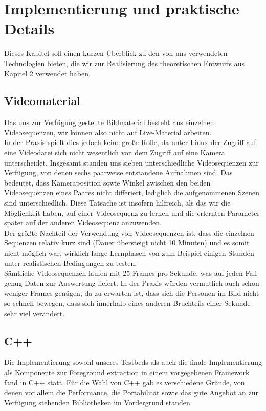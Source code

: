 \section{Implementierung und praktische Details}
\label{chap:implementierung}

Dieses Kapitel soll einen kurzen Überblick zu den von uns verwendeten Technologien bieten, die wir zur Realisierung des theoretischen Entwurfs aus Kapitel 2 verwendet haben.


\subsection{Videomaterial}
\label{sec:videomat}

Das uns zur Verfügung gestellte Bildmaterial besteht aus einzelnen Videosequenzen, wir können also nicht auf Live-Material arbeiten.\\

In der Praxis spielt dies jedoch keine große Rolle, da unter Linux der Zugriff auf eine Videodatei sich nicht wesentlich von dem Zugriff auf eine Kamera unterscheidet.
Insgesamt standen uns sieben unterschiedliche Videosequenzen zur Verfügung, von denen sechs paarweise entstandene Aufnahmen sind.
 Das bedeutet, dass Kameraposition sowie Winkel zwischen den beiden Videosequenzen eines Paares nicht differiert, lediglich die aufgenommenen Szenen sind unterschiedlich.
 Diese Tatsache ist insofern hilfreich, als das wir die Möglichkeit haben, auf einer Videosequenz zu lernen und die erlernten Parameter später auf der anderen Videosequenz anzuwenden.\\

Der größte Nachteil der Verwendung von Videosequenzen ist, dass die einzelnen Sequenzen relativ kurz sind (Dauer übersteigt nicht 10 Minuten) und es somit nicht möglich war, wirklich lange Lernphasen von zum Beispiel einigen Stunden unter realistischen Bedingungen zu testen.\\

Sämtliche Videosequenzen laufen mit 25 Frames pro Sekunde, was auf jeden Fall genug Daten zur Auswertung liefert.
 In der Praxis würden vermutlich auch schon weniger Frames genügen, da zu erwarten ist, dass sich die Personen im Bild nicht so schnell bewegen, dass sich innerhalb eines anderen Bruchteils einer Sekunde sehr viel verändert.

\subsection{C++}
\label{sec:cpp}
Die Implementierung sowohl unseres Testbeds als auch die finale Implementierung als Komponente zur Foreground extraction in einem vorgegebenen Framework fand in C++ statt.
 Für die Wahl von C++ gab es verschiedene Gründe, von denen vor allem die Performance, die Portabilität sowie das gute Angebot an zur Verfügung stehenden Bibliotheken im Vordergrund standen.

